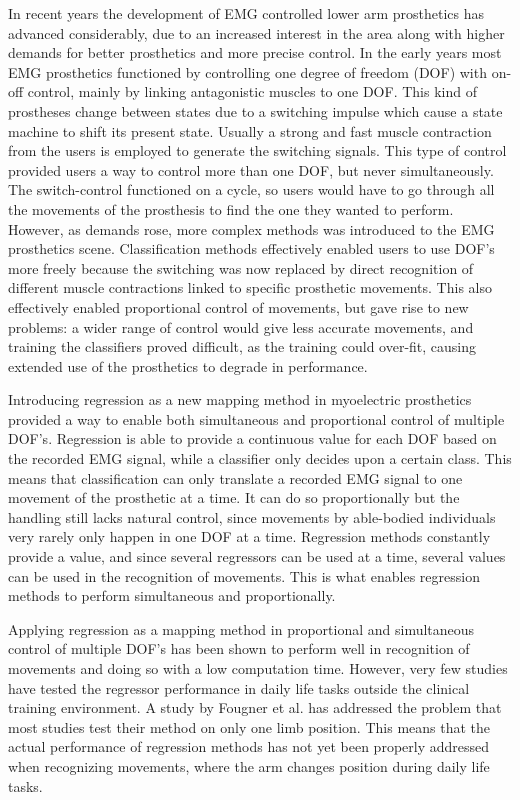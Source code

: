 \begin{multicols}{2}
%		
In recent years the development of EMG controlled lower arm prosthetics has advanced considerably, due to an increased interest in the area along with higher demands for better prosthetics and more precise control. \cite{Fougner2012} In the early years most EMG prosthetics functioned by controlling one degree of freedom (DOF) with on-off control, mainly by linking antagonistic muscles to one DOF. This kind of prostheses change between states due to a switching impulse which cause a state machine to shift its present state. Usually a strong and fast muscle contraction from the users is employed to generate the switching signals. \cite{amsuess2014}
This type of control provided users a way to control more than one DOF, but never simultaneously. The switch-control functioned on a cycle, so users would have to go through all the movements of the prosthesis to find the one they wanted to perform. However, as demands rose, more complex methods was introduced to the EMG prosthetics scene. Classification methods effectively enabled users to use DOF's more freely because the switching was now replaced by direct recognition of different muscle contractions linked to specific prosthetic movements. This also effectively enabled proportional control of movements, but gave rise to new problems: a wider range of control would give less accurate movements, and training the classifiers proved difficult, as the training could over-fit, causing extended use of the prosthetics to degrade in performance. \cite{Ison2016}

Introducing regression as a new mapping method in myoelectric prosthetics provided a way to enable both simultaneous and proportional control of multiple DOF's. Regression is able to provide a continuous value for each DOF based on the recorded EMG signal, while a classifier only decides upon a certain class. \cite{hahne2014, jiang2010}
This means that classification can only translate a recorded EMG signal to one movement of the prosthetic at a time. It can do so proportionally but the handling still lacks natural control, since movements by able-bodied individuals very rarely only happen in one DOF at a time. Regression methods constantly provide a value, and since several regressors can be used at a time, several values can be used in the recognition of movements. This is what enables regression methods to perform simultaneous and proportionally. 

Applying regression as a mapping method in proportional and simultaneous control of multiple DOF's has been shown to perform well in recognition of movements and doing so with a low computation time. \cite{hahne2014} However, very few studies have tested the regressor performance in daily life tasks outside the clinical training environment. \cite{jiang2012} A study by Fougner et al. \cite{Fougner2011} has addressed the problem that most studies test their method on only one limb position. This means that the actual performance of regression methods has not yet been properly addressed when recognizing movements, where the arm changes position during daily life tasks. 


\end{multicols}
